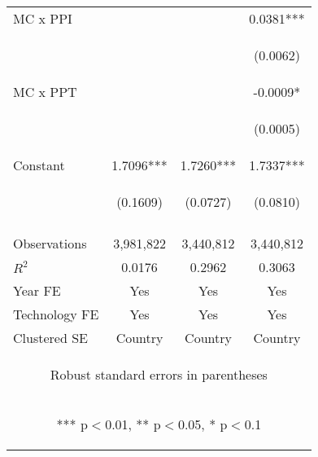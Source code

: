 \begin{center}
\begin{tabular}{lccc}
MC x PPI &  &  & 0.0381*** \\
\vspace{4pt} & \begin{footnotesize}\end{footnotesize} & \begin{footnotesize}\end{footnotesize} & \begin{footnotesize}(0.0062)\end{footnotesize} \\
MC x PPT &  &  & -0.0009* \\
\vspace{4pt} & \begin{footnotesize}\end{footnotesize} & \begin{footnotesize}\end{footnotesize} & \begin{footnotesize}(0.0005)\end{footnotesize} \\
Constant & 1.7096*** & 1.7260*** & 1.7337*** \\
 & \begin{footnotesize}(0.1609)\end{footnotesize} & \begin{footnotesize}(0.0727)\end{footnotesize} & \begin{footnotesize}(0.0810)\end{footnotesize} \\
\vspace{4pt} & \begin{footnotesize}\end{footnotesize} & \begin{footnotesize}\end{footnotesize} & \begin{footnotesize}\end{footnotesize} \\
Observations & 3,981,822 & 3,440,812 & 3,440,812 \\
$R^2$ & 0.0176 & 0.2962 & 0.3063 \\
Year FE & Yes & Yes & Yes \\
Technology FE & Yes & Yes & Yes \\
 Clustered SE & Country & Country & Country \\ \hline
\multicolumn{4}{c}{\begin{footnotesize} Robust standard errors in parentheses\end{footnotesize}} \\
\multicolumn{4}{c}{\begin{footnotesize} *** p$<$0.01, ** p$<$0.05, * p$<$0.1\end{footnotesize}} \\
\end{tabular}
\end{center}
